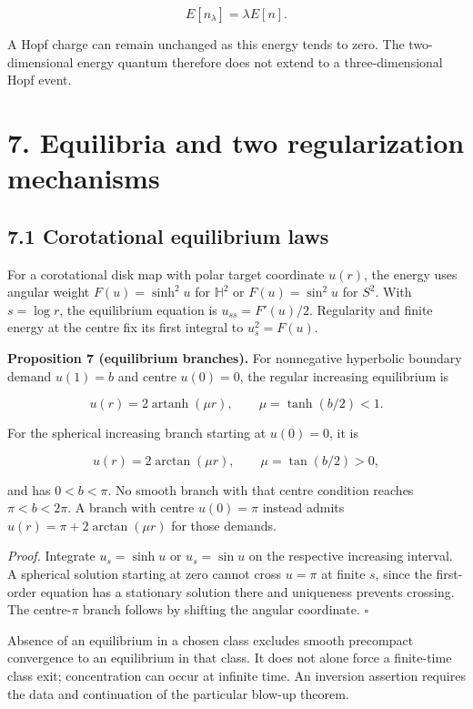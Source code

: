 \documentclass[
  11pt,
  a4paper,
]{article}
\begin{document}
\[
E[n_\lambda]=\lambda E[n].
\]

A Hopf charge can remain unchanged as this energy tends to zero. The two-dimensional energy quantum therefore does not extend to a three-dimensional Hopf event.

\section{7. Equilibria and two regularization mechanisms}\label{equilibria-and-two-regularization-mechanisms}

\subsection{7.1 Corotational equilibrium laws}\label{corotational-equilibrium-laws}

For a corotational disk map with polar target coordinate \(u(r)\), the energy uses angular weight \(F(u)=\sinh^2u\) for \(\mathbb H^2\) or \(F(u)=\sin^2u\) for \(S^2\). With \(s=\log r\), the equilibrium equation is \(u_{ss}=F'(u)/2\). Regularity and finite energy at the centre fix its first integral to \(u_s^2=F(u)\).

\textbf{Proposition 7 (equilibrium branches).} For nonnegative hyperbolic boundary demand \(u(1)=b\) and centre \(u(0)=0\), the regular increasing equilibrium is

\[
u(r)=2\operatorname{artanh}(\mu r),\qquad \mu=\tanh(b/2)<1.
\]

For the spherical increasing branch starting at \(u(0)=0\), it is

\[
u(r)=2\arctan(\mu r),\qquad \mu=\tan(b/2)>0,
\]

and has \(0<b<\pi\). No smooth branch with that centre condition reaches \(\pi<b<2\pi\). A branch with centre \(u(0)=\pi\) instead admits \(u(r)=\pi+2\arctan(\mu r)\) for those demands.

\emph{Proof.} Integrate \(u_s=\sinh u\) or \(u_s=\sin u\) on the respective increasing interval. A spherical solution starting at zero cannot cross \(u=\pi\) at finite \(s\), since the first-order equation has a stationary solution there and uniqueness prevents crossing. The centre-\(\pi\) branch follows by shifting the angular coordinate. \(\square\)

Absence of an equilibrium in a chosen class excludes smooth precompact convergence to an equilibrium in that class. It does not alone force a finite-time class exit; concentration can occur at infinite time. An inversion assertion requires the data and continuation of the particular blow-up theorem.
\end{document}
